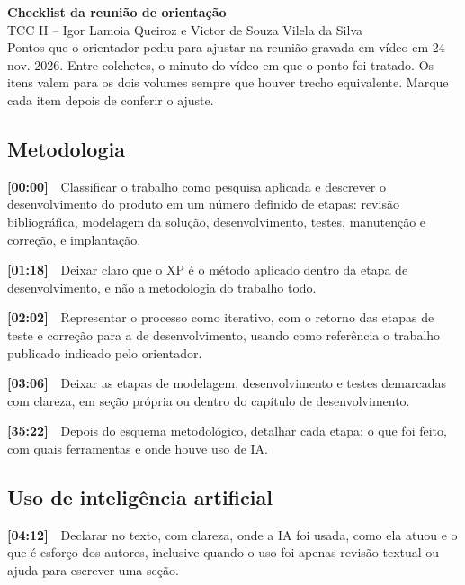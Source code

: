 \documentclass[11pt,a4paper]{article}
\newcommand{\tm}[1]{\textbf{[#1]}\ \ }
\begin{document}
{\LARGE\bfseries Checklist da reunião de orientação}\\[4pt]
{\large TCC II -- Igor Lamoia Queiroz e Victor de Souza Vilela da Silva}\\[8pt]
Pontos que o orientador pediu para ajustar na reunião gravada em vídeo em 24 nov. 2026. Entre colchetes, o minuto do vídeo em que o ponto foi tratado. Os itens valem para os dois volumes sempre que houver trecho equivalente. Marque cada item depois de conferir o ajuste.

\subsection*{Metodologia}
\begin{checklist}
  \item \tm{00:00}Classificar o trabalho como pesquisa aplicada e descrever o desenvolvimento do produto em um número definido de etapas: revisão bibliográfica, modelagem da solução, desenvolvimento, testes, manutenção e correção, e implantação.
  \item \tm{01:18}Deixar claro que o XP é o método aplicado dentro da etapa de desenvolvimento, e não a metodologia do trabalho todo.
  \item \tm{02:02}Representar o processo como iterativo, com o retorno das etapas de teste e correção para a de desenvolvimento, usando como referência o trabalho publicado indicado pelo orientador.
  \item \tm{03:06}Deixar as etapas de modelagem, desenvolvimento e testes demarcadas com clareza, em seção própria ou dentro do capítulo de desenvolvimento.
  \item \tm{35:22}Depois do esquema metodológico, detalhar cada etapa: o que foi feito, com quais ferramentas e onde houve uso de IA.
\end{checklist}
\subsection*{Uso de inteligência artificial}
\begin{checklist}
  \item \tm{04:12}Declarar no texto, com clareza, onde a IA foi usada, como ela atuou e o que é esforço dos autores, inclusive quando o uso foi apenas revisão textual ou ajuda para escrever uma seção.
\end{checklist}
\end{document}
